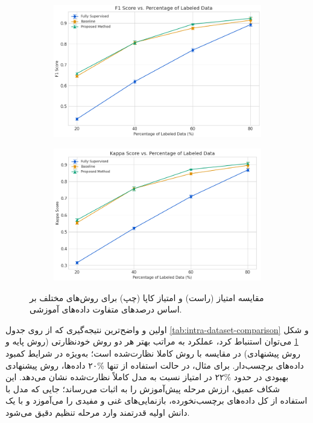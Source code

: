 \begin{figure}[ht!]
    \centering
    \begin{subfigure}[b]{0.49\textwidth}
        \includegraphics[width=\textwidth]{Images/Chapter4/main-results-f1.png}
    \end{subfigure}
    \hfill %
    \begin{subfigure}[b]{0.49\textwidth}
        \includegraphics[width=\textwidth]{Images/Chapter4/main-results-kappa.png}
    \end{subfigure}
    \caption{مقایسه امتیاز  (راست) و امتیاز کاپا (چپ) برای روش‌های مختلف بر اساس درصدهای متفاوت داده‌های آموزشی.}
    \label{fig:main-results}
\end{figure}

اولین و واضح‌ترین نتیجه‌گیری که از روی جدول \ref{tab:intra-dataset-comparison} و شکل \ref{fig:main-results} می‌توان استنباط کرد، عملکرد به مراتب بهتر هر دو روش خودنظارتی (روش پایه و روش پیشنهادی) در مقایسه با روش کاملا نظارت‌شده است؛ به‌ویژه در شرایط کمبود داده‌های برچسب‌دار. برای مثال، در حالت استفاده از تنها \%۲۰ داده‌ها، روش پیشنهادی بهبودی در حدود \%۲۲ در امتیاز  نسبت به مدل کاملاً نظارت‌شده نشان می‌دهد.
این شکاف عمیق، ارزش مرحله پیش‌آموزش را به اثبات می‌رساند؛ جایی که مدل با استفاده از کل داده‌های برچسب‌نخورده، بازنمایی‌های غنی و مفیدی را می‌آموزد و با یک دانش اولیه قدرتمند وارد مرحله تنظیم دقیق می‌شود.

